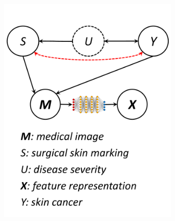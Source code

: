 \documentclass[11pt]{article}
\begin{document}
\begin{figure}[t]
\begin{subfigure}[b]{0.24\textwidth}
   \includegraphics[width=\linewidth]{submissions/submission5/figs/confounding-bias.pdf}
   \vspace{-.5cm}
   \caption{}
   \label{fig:confounding-bias}
\end{subfigure}
\hfill
\begin{subfigure}[b]{0.24\textwidth}

\end{subfigure}
\end{figure}
\end{document}
